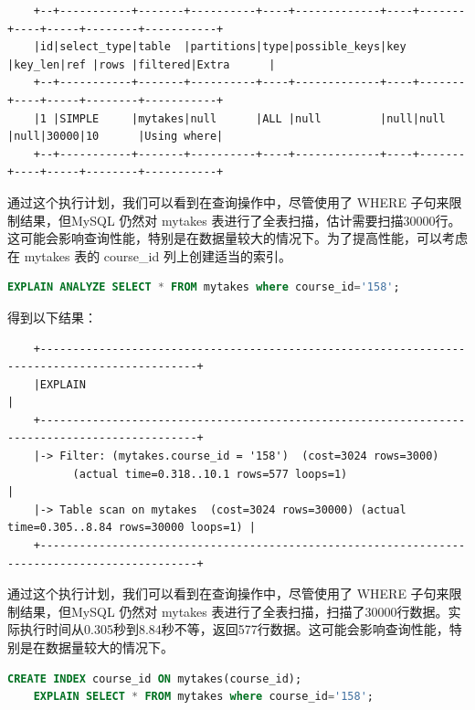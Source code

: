 \documentclass{article}
\begin{document}
	\begin{verbatim}
	+--+-----------+-------+----------+----+-------------+----+-------+----+-----+--------+-----------+
	|id|select_type|table  |partitions|type|possible_keys|key |key_len|ref |rows |filtered|Extra      |
	+--+-----------+-------+----------+----+-------------+----+-------+----+-----+--------+-----------+
	|1 |SIMPLE     |mytakes|null      |ALL |null         |null|null   |null|30000|10      |Using where|
	+--+-----------+-------+----------+----+-------------+----+-------+----+-----+--------+-----------+
	\end{verbatim}
	
	通过这个执行计划，我们可以看到在查询操作中，尽管使用了 WHERE 子句来限制结果，但MySQL 仍然对 mytakes 表进行了全表扫描，估计需要扫描30000行。这可能会影响查询性能，特别是在数据量较大的情况下。为了提高性能，可以考虑在 mytakes 表的 course\_id 列上创建适当的索引。

	\begin{lstlisting}[language=sql, title=索引对查询性能的影响, tabsize=4]
	EXPLAIN ANALYZE SELECT * FROM mytakes where course_id='158';
	\end{lstlisting}
	
	得到以下结果：
	
	\begin{verbatim}
	+----------------------------------------------------------------------------------------------+
	|EXPLAIN                                                                                       |
	+----------------------------------------------------------------------------------------------+
	|-> Filter: (mytakes.course_id = '158')  (cost=3024 rows=3000) 
	      (actual time=0.318..10.1 rows=577 loops=1)                                               |
	|-> Table scan on mytakes  (cost=3024 rows=30000) (actual time=0.305..8.84 rows=30000 loops=1) |
	+----------------------------------------------------------------------------------------------+
	\end{verbatim}
	
	通过这个执行计划，我们可以看到在查询操作中，尽管使用了 WHERE 子句来限制结果，但MySQL 仍然对 mytakes 表进行了全表扫描，扫描了30000行数据。实际执行时间从0.305秒到8.84秒不等，返回577行数据。这可能会影响查询性能，特别是在数据量较大的情况下。

	\begin{lstlisting}[language=sql, title=索引对查询性能的影响, tabsize=4]
	CREATE INDEX course_id ON mytakes(course_id);
	EXPLAIN SELECT * FROM mytakes where course_id='158';
	\end{lstlisting}
	
\end{document}
